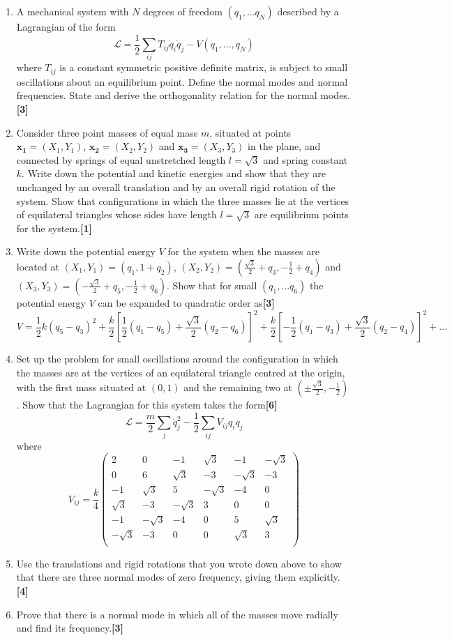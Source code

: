 \documentclass[a4paper]{article}
\begin{document}
\begin{qns}\leavevmode
\begin{enumerate}[label=(\roman*)]
    \item  A mechanical system with $N$ degrees of freedom $(q_1, . . . q_N)$ described by a Lagrangian of the form
$$\mathcal{L}=\frac{1}{2}\sum_{ij}T_{ij}\dot{q}_i\dot{q}_j-V(q_1,...,q_N)$$
where $T_{ij}$ is a constant symmetric positive definite matrix, is subject to small oscillations about an equilibrium point. Define the normal modes and normal frequencies. State and derive the orthogonality relation for the normal modes.\hfill\textbf{[3]}
\item Consider three point masses of equal mass $m$, situated at points $\mathbf{x_1}=(X_1,Y_1)$,  $\mathbf{x_2}=(X_2,Y_2)$ and  $\mathbf{x_3}=(X_3,Y_3)$ in the plane, and connected by springs of equal unstretched length $l=\sqrt{3}$ and spring constant $k$. Write down the potential and kinetic energies and show that they are unchanged by an overall translation and by an overall rigid rotation of the system. Show that configurations in which the three masses lie at the vertices of equilateral triangles whose sides have length $l=\sqrt{3}$ are equilibrium points for the system.\hfill\textbf{[1]}
\item Write down the potential energy $V$ for the system when the masses are located at $(X_1,Y_1)=(q_1,1+q_2)$, $(X_2,Y_2)=(\frac{\sqrt{3}}{2}+q_3,-\frac{1}{2}+q_4)$ and $(X_3,Y_3)=(-\frac{\sqrt{3}}{2}+q_5,-\frac{1}{2}+q_6)$. Show that for small $(q_1, . . . q_6)$ the potential energy $V$ can be expanded to quadratic order as\hfill\textbf{[3]}
$$V=\frac{1}{2}k(q_5-q_3)^2+\frac{k}{2}[\frac{1}{2}(q_1-q_5)+\frac{\sqrt{3}}{2}(q_2-q_6)]^2+\frac{k}{2}[-\frac{1}{2}(q_1-q_3)+\frac{\sqrt{3}}{2}(q_2-q_4)]^2+...$$
\item Set up the problem for small oscillations around the configuration in which the masses are at the vertices of an equilateral triangle centred at the origin, with the first mass situated at $(0, 1)$ and the remaining two at $(\pm\frac{\sqrt{3}}{2},-\frac{1}{2})$. Show that the Lagrangian for this system takes the form\hfill\textbf{[6]}
$$\mathcal{L}=\frac{m}{2}\sum_j\dot{q}_j^2-\frac{1}{2}\sum_{ij}V_{ij}q_iq_j$$
where
$$V_{ij}=\frac{k}{4}\begin{pmatrix}2&0&-1&\sqrt{3}&-1&-\sqrt{3}\\0&6&\sqrt{3}&-3&-\sqrt{3}&-3\\-1&\sqrt{3}&5&-\sqrt{3}&-4&0\\\sqrt{3}&-3&-\sqrt{3}&3&0&0\\-1&-\sqrt{3}&-4&0&5&\sqrt{3}\\-\sqrt{3}&-3&0&0&\sqrt{3}&3\\\end{pmatrix}$$
\item Use the translations and rigid rotations that you wrote down above to show that there are three normal modes of zero frequency, giving them explicitly.\hfill\textbf{[4]}
\item Prove that there is a normal mode in which all of the masses move radially and find its frequency.\hfill\textbf{[3]}
\end{enumerate}
\end{qns}
\end{document}
